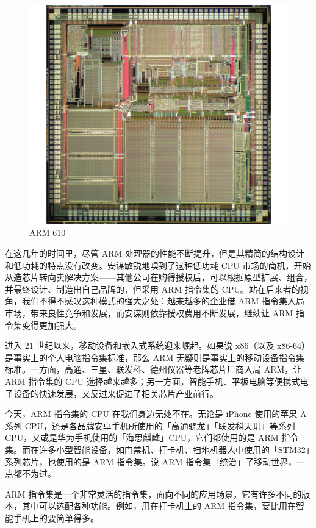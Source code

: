 \begin{figure}[htb!]
  \centering
  \includegraphics[width=.7\textwidth]{assets/surpass/ARM610_die.jpg}
  \caption{ARM 610}
  \label{fig:ARM610_die}
\end{figure}

在这几年的时间里，尽管 ARM 处理器的性能不断提升，但是其精简的结构设计和低功耗的特点没有改变。安谋敏锐地嗅到了这种低功耗 CPU 市场的商机，开始从造芯片转向卖解决方案——其他公司在购得授权后，可以根据原型扩展、组合，并最终设计、制造出自己品牌的，但采用 ARM 指令集的 CPU。站在后来者的视角，我们不得不感叹这种模式的强大之处：越来越多的企业借 ARM 指令集入局市场，带来良性竞争和发展，而安谋则依靠授权费用不断发展，继续让 ARM 指令集变得更加强大。

进入 21 世纪以来，移动设备和嵌入式系统迎来崛起。如果说 x86（以及 x86-64）是事实上的个人电脑指令集标准，那么 ARM 无疑则是事实上的移动设备指令集标准。一方面，高通、三星、联发科、德州仪器等老牌芯片厂商入局 ARM，让 ARM 指令集的 CPU 选择越来越多；另一方面，智能手机、平板电脑等便携式电子设备的快速发展，又反过来促进了相关芯片产业前行。

今天，ARM 指令集的 CPU 在我们身边无处不在。无论是 iPhone 使用的苹果 A 系列 CPU，还是各品牌安卓手机所使用的「高通骁龙」「联发科天玑」等系列 CPU，又或是华为手机使用的「海思麒麟」CPU，它们都使用的是 ARM 指令集。而在许多小型智能设备，如门禁机、打卡机、扫地机器人中使用的「STM32」系列芯片，也使用的是 ARM 指令集。说 ARM 指令集「统治」了移动世界，一点都不为过。

\begin{note}
  ARM 指令集是一个非常灵活的指令集，面向不同的应用场景，它有许多不同的版本，其中可以选配各种功能。例如，用在打卡机上的 ARM 指令集，要比用在智能手机上的要简单得多。
\end{note}

